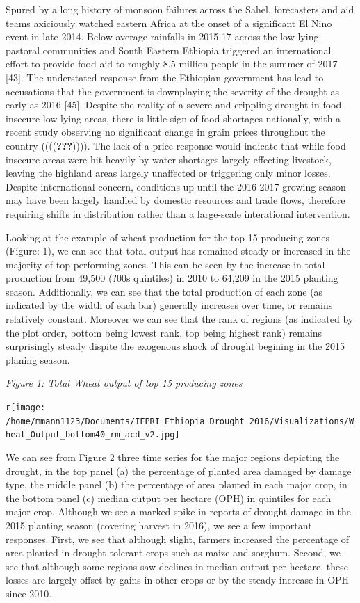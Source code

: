 \documentclass[10pt,letterpaper]{article}
\begin{document}
Spured by a long history of monsoon failures across the Sahel,
forecasters and aid teams axiciously watched eastern Africa at the onset
of a significant El Nino event in late 2014. Below average rainfalls in
2015-17 across the low lying pastoral communities and South Eastern
Ethiopia triggered an international effort to provide food aid to
roughly 8.5 million people in the summer of 2017 {[}43{]}. The
understated response from the Ethiopian government has lead to
accusations that the government is downplaying the severity of the
drought as early as 2016 {[}45{]}. Despite the reality of a severe and
crippling drought in food insecure low lying areas, there is little sign
of food shortages nationally, with a recent study observing no
significant change in grain prices throughout the country
((((\textbf{???})))). The lack of a price response would indicate that
while food insecure areas were hit heavily by water shortages largely
effecting livestock, leaving the highland areas largely unaffected or
triggering only minor losses. Despite international concern, conditions
up until the 2016-2017 growing season may have been largely handled by
domestic resources and trade flows, therefore requiring shifts in
distribution rather than a large-scale interational intervention.

Looking at the example of wheat production for the top 15 producing
zones (Figure: 1), we can see that total output has remained steady or
increased in the majority of top performing zones. This can be seen by
the increase in total production from 49,500 (?00s quintiles) in 2010 to
64,209 in the 2015 planting season. Additionally, we can see that the
total production of each zone (as indicated by the width of each bar)
generally increases over time, or remains relatively constant. Moreover
we can see that the rank of regions (as indicated by the plot order,
bottom being lowest rank, top being highest rank) remains surprisingly
steady dispite the exogenous shock of drought begining in the 2015
planing season.

\newpage

\emph{Figure 1: Total Wheat output of top 15 producing zones}

\texttt{r}\texttt{[image: /home/mmann1123/Documents/IFPRI\_Ethiopia\_Drought\_2016/Visualizations/Wheat\_Output\_bottom40\_rm\_acd\_v2.jpg]}

We can see from Figure 2 three time series for the major regions
depicting the drought, in the top panel (a) the percentage of planted
area damaged by damage type, the middle panel (b) the percentage of area
planted in each major crop, in the bottom panel (c) median output per
hectare (OPH) in quintiles for each major crop. Although we see a marked
spike in reports of drought damage in the 2015 planting season (covering
harvest in 2016), we see a few important responses. First, we see that
although slight, farmers increased the percentage of area planted in
drought tolerant crops such as maize and sorghum. Second, we see that
although some regions saw declines in median output per hectare, these
losses are largely offset by gains in other crops or by the steady
increase in OPH since 2010.
\end{document}
